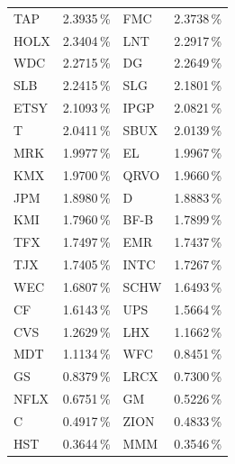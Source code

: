 \begin{longtable}{l c | l c}
    TAP    & 2.3935\,\%             & FMC    & 2.3738\,\%                                    \\
    HOLX   & 2.3404\,\%             & LNT    & 2.2917\,\%                                    \\
    WDC    & 2.2715\,\%             & DG     & 2.2649\,\%                                    \\
    SLB    & 2.2415\,\%             & SLG    & 2.1801\,\%                                    \\
    ETSY   & 2.1093\,\%             & IPGP   & 2.0821\,\%                                    \\
    T      & 2.0411\,\%             & SBUX   & 2.0139\,\%                                    \\
    MRK    & 1.9977\,\%             & EL     & 1.9967\,\%                                    \\
    KMX    & 1.9700\,\%             & QRVO   & 1.9660\,\%                                    \\
    JPM    & 1.8980\,\%             & D      & 1.8883\,\%                                    \\
    KMI    & 1.7960\,\%             & BF-B   & 1.7899\,\%                                    \\
    TFX    & 1.7497\,\%             & EMR    & 1.7437\,\%                                    \\
    TJX    & 1.7405\,\%             & INTC   & 1.7267\,\%                                    \\
    WEC    & 1.6807\,\%             & SCHW   & 1.6493\,\%                                    \\
    CF     & 1.6143\,\%             & UPS    & 1.5664\,\%                                    \\
    CVS    & 1.2629\,\%             & LHX    & 1.1662\,\%                                    \\
    MDT    & 1.1134\,\%             & WFC    & 0.8451\,\%                                    \\
    GS     & 0.8379\,\%             & LRCX   & 0.7300\,\%                                    \\
    NFLX   & 0.6751\,\%             & GM     & 0.5226\,\%                                    \\
    C      & 0.4917\,\%             & ZION   & 0.4833\,\%                                    \\
    HST    & 0.3644\,\%             & MMM    & 0.3546\,\%                                    \\

\end{longtable}
